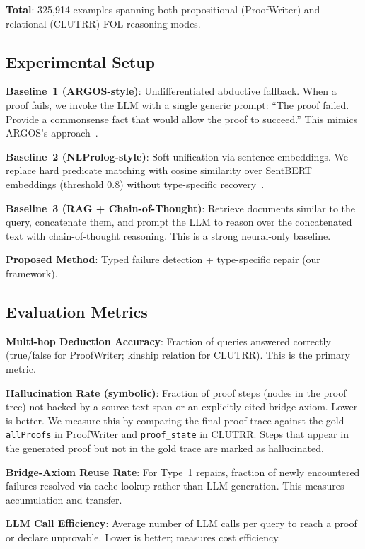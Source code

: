 \documentclass[11pt,letterpaper]{article}
\begin{document}
\textbf{Total}: 325,914 examples spanning both propositional (ProofWriter) and relational (CLUTRR) FOL reasoning modes.

\subsection{Experimental Setup}

\textbf{Baseline~1 (ARGOS-style)}: Undifferentiated abductive fallback. When a proof fails, we invoke the LLM with a single generic prompt: ``The proof failed. Provide a commonsense fact that would allow the proof to succeed.'' This mimics ARGOS's approach~\citep{Cotnareanu2026}.

\textbf{Baseline~2 (NLProlog-style)}: Soft unification via sentence embeddings. We replace hard predicate matching with cosine similarity over SentBERT embeddings (threshold 0.8) without type-specific recovery~\citep{Weber2019}.

\textbf{Baseline~3 (RAG + Chain-of-Thought)}: Retrieve documents similar to the query, concatenate them, and prompt the LLM to reason over the concatenated text with chain-of-thought reasoning. This is a strong neural-only baseline.

\textbf{Proposed Method}: Typed failure detection + type-specific repair (our framework).

\subsection{Evaluation Metrics}

\textbf{Multi-hop Deduction Accuracy}: Fraction of queries answered correctly (true/false for ProofWriter; kinship relation for CLUTRR). This is the primary metric.

\textbf{Hallucination Rate (symbolic)}: Fraction of proof steps (nodes in the proof tree) not backed by a source-text span or an explicitly cited bridge axiom. Lower is better. We measure this by comparing the final proof trace against the gold \texttt{allProofs} in ProofWriter and \texttt{proof\_state} in CLUTRR. Steps that appear in the generated proof but not in the gold trace are marked as hallucinated.

\textbf{Bridge-Axiom Reuse Rate}: For Type~1 repairs, fraction of newly encountered failures resolved via cache lookup rather than LLM generation. This measures accumulation and transfer.

\textbf{LLM Call Efficiency}: Average number of LLM calls per query to reach a proof or declare unprovable. Lower is better; measures cost efficiency.
\end{document}
